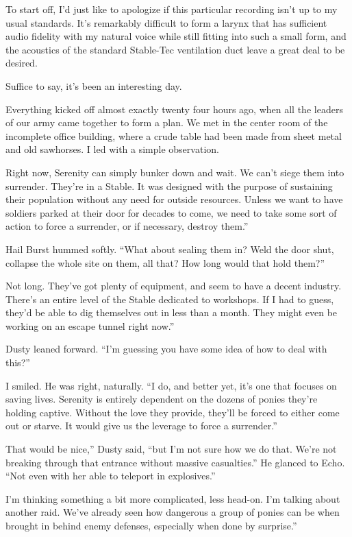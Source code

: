 To start off, I’d just like to apologize if this particular recording isn’t up to my usual standards. It’s remarkably difficult to form a larynx that has sufficient audio fidelity with my natural voice while still fitting into such a small form, and the acoustics of the standard Stable-Tec ventilation duct leave a great deal to be desired.

Suffice to say, it’s been an interesting day.

{\br}%
Everything kicked off almost exactly twenty four hours ago, when all the leaders of our army came together to form a plan. We met in the center room of the incomplete office building, where a crude table had been made from sheet metal and old sawhorses. I led with a simple observation.

\leavevmode{}Right now, Serenity can simply bunker down and wait. We can’t siege them into surrender. They’re in a Stable. It was designed with the purpose of sustaining their population without any need for outside resources. Unless we want to have soldiers parked at their door for decades to come, we need to take some sort of action to force a surrender, or if necessary, destroy them.”

Hail Burst hummed softly. “What about sealing them in? Weld the door shut, collapse the whole site on them, all that? How long would that hold them?”

\leavevmode{}Not long. They’ve got plenty of equipment, and seem to have a decent industry. There’s an entire level of the Stable dedicated to workshops. If I had to guess, they’d be able to dig themselves out in less than a month. They might even be working on an escape tunnel right now.”

Dusty leaned forward. “I’m guessing you have some idea of how to deal with this?”

I smiled. He was right, naturally. “I do, and better yet, it’s one that focuses on saving lives. Serenity is entirely dependent on the dozens of ponies they’re holding captive. Without the love they provide, they’ll be forced to either come out or starve. It would give us the leverage to force a surrender.”

\leavevmode{}That would be nice,” Dusty said, “but I’m not sure how we do that. We’re not breaking through that entrance without massive casualties.” He glanced to Echo. “Not even with her able to teleport in explosives.”

\leavevmode{}I’m thinking something a bit more complicated, less head-on. I’m talking about another raid. We’ve already seen how dangerous a group of ponies can be when brought in behind enemy defenses, especially when done by surprise.”

